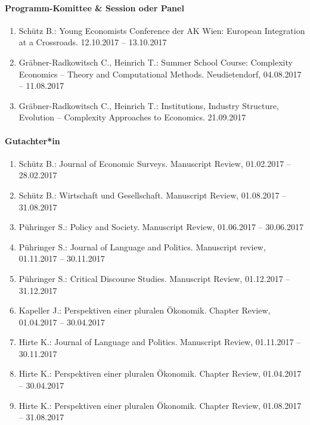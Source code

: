 \paragraph{Programm-Komittee \& Session oder Panel}
\begin{enumerate}[leftmargin=*, labelsep=0.5cm]
\item Schütz B.: Young Economists Conference der AK Wien: European Integration at a Crossroads. 12.10.2017 -- 13.10.2017
\item Gräbner-Radkowitsch C., Heinrich T.: Summer School Course: Complexity Economics -- Theory and Computational Methods. Neudietendorf, 04.08.2017 -- 11.08.2017
\item Gräbner-Radkowitsch C., Heinrich T.: Institutions, Industry Structure, Evolution -- Complexity Approaches to Economics. 21.09.2017
\end{enumerate}

\paragraph{Gutachter*in}
\begin{enumerate}[leftmargin=*, labelsep=0.5cm]
\item Schütz B.: Journal of Economic Surveys. Manuscript Review, 01.02.2017 -- 28.02.2017
\item Schütz B.: Wirtschaft und Gesellschaft. Manuscript Review, 01.08.2017 -- 31.08.2017
\item Pühringer S.: Policy and Society. Manuscript Review, 01.06.2017 -- 30.06.2017
\item Pühringer S.: Journal of Language and Politics. Manuscript review, 01.11.2017 -- 30.11.2017
\item Pühringer S.: Critical Discourse Studies. Manuscript Review, 01.12.2017 -- 31.12.2017
\item Kapeller J.: Perspektiven einer pluralen Ökonomik. Chapter Review, 01.04.2017 -- 30.04.2017
\item Hirte K.: Journal of Language and Politics. Manuscript Review, 01.11.2017 -- 30.11.2017
\item Hirte K.: Perspektiven einer pluralen Ökonomik. Chapter Review, 01.04.2017 -- 30.04.2017
\item Hirte K.: Perspektiven einer pluralen Ökonomik. Chapter Review, 01.08.2017 -- 31.08.2017
\end{enumerate}

